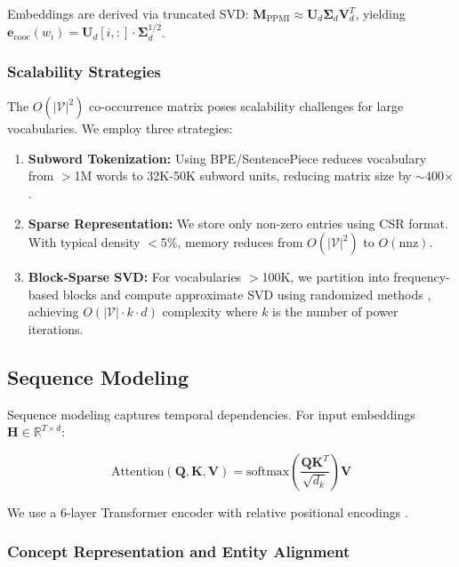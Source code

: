 \documentclass[conference]{IEEEtran}
\begin{document}
Embeddings are derived via truncated SVD: $\mathbf{M}_{\text{PPMI}} \approx \mathbf{U}_d \mathbf{\Sigma}_d \mathbf{V}_d^T$, yielding $\mathbf{e}_{\text{cooc}}(w_i) = \mathbf{U}_d[i,:] \cdot \mathbf{\Sigma}_d^{1/2}$.

\subsubsection{Scalability Strategies}
\label{sec:scalability}

The $O(|\mathcal{V}|^2)$ co-occurrence matrix poses scalability challenges for large vocabularies. We employ three strategies:

\begin{enumerate}[leftmargin=*]
    \item \textbf{Subword Tokenization:} Using BPE/SentencePiece reduces vocabulary from $>$1M words to 32K-50K subword units, reducing matrix size by $\sim$400$\times$.
    
    \item \textbf{Sparse Representation:} We store only non-zero entries using CSR format. With typical density $<$5\%, memory reduces from $O(|\mathcal{V}|^2)$ to $O(\text{nnz})$.
    
    \item \textbf{Block-Sparse SVD:} For vocabularies $>$100K, we partition into frequency-based blocks and compute approximate SVD using randomized methods \cite{halko2011finding}, achieving $O(|\mathcal{V}| \cdot k \cdot d)$ complexity where $k$ is the number of power iterations.
\end{enumerate}

\subsection{Sequence Modeling}

Sequence modeling captures temporal dependencies. For input embeddings $\mathbf{H} \in \mathbb{R}^{T \times d}$:

\begin{equation}
\text{Attention}(\mathbf{Q}, \mathbf{K}, \mathbf{V}) = \text{softmax}\left(\frac{\mathbf{Q}\mathbf{K}^T}{\sqrt{d_k}}\right) \mathbf{V}
\end{equation}

We use a 6-layer Transformer encoder with relative positional encodings \cite{shaw2018selfattention}.

\subsubsection{Concept Representation and Entity Alignment}
\label{sec:entity_alignment}
\end{document}
